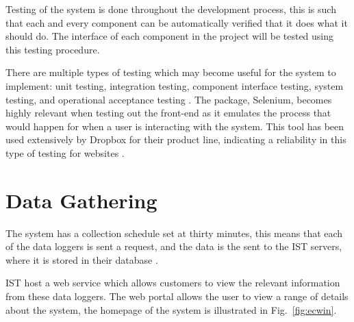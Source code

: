 \documentclass[12pt,onecolumn]{IEEEtran}
\begin{document}

Testing of the system is done throughout the development process, this is such that each and every component can be automatically verified that it does what it should do. 
The interface of each component in the project will be tested using this testing procedure. 

There are multiple types of testing which may become useful for the system to implement: unit testing, integration testing, component interface testing, system testing, and operational acceptance testing \cite{swebok}.
The package, Selenium, becomes highly relevant when testing out the front-end as it emulates the process that would happen for when a user is interacting with the system. This tool has been used extensively by Dropbox for their product line, indicating a reliability in this type of testing for websites \cite{dropbox}.







\appendix
\section*{Data Gathering} \label{sec:DataGathering}

The system has a collection schedule set at thirty minutes, this means that each of the data loggers is sent a request, and the data is the sent to the IST servers, where it is stored in their database \cite{datasite}.


IST host a web service which allows customers to view the relevant information from these data loggers. 
The web portal allows the user to view a range of details about the system, the homepage of the system is illustrated in Fig.~\ref{fig:ecwin}.
\end{document}
